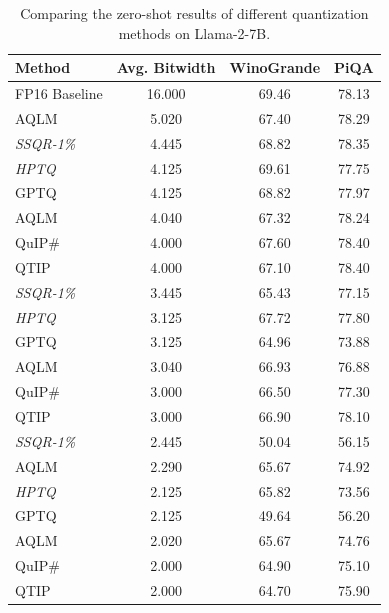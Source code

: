 \documentclass{article} %
\begin{document}
\begin{table}[htpb]
\caption{Comparing the zero-shot results of different quantization methods on Llama-2-7B.}
\label{tab:compare_to_other_methods}
\begin{center}
\begin{tabular}{lccc}
\toprule
Method & Avg. Bitwidth & WinoGrande & PiQA \\
\midrule
FP16 Baseline        & 16.000            & 69.46               & 78.13         \\
\midrule
AQLM            & 5.020             & 67.40               & 78.29         \\
\textit{SSQR-1\%}        & 4.445             & 68.82               & 78.35         \\
\textit{HPTQ}            & 4.125             & 69.61               & 77.75         \\
GPTQ            & 4.125             & 68.82               & 77.97         \\
AQLM            & 4.040             & 67.32               & 78.24         \\
QuIP\#          & 4.000             & 67.60               & 78.40         \\
QTIP            & 4.000             & 67.10               & 78.40         \\
\midrule
\textit{SSQR-1\%}        & 3.445             & 65.43               & 77.15         \\
\textit{HPTQ}            & 3.125             & 67.72               & 77.80         \\
GPTQ            & 3.125             & 64.96               & 73.88         \\
AQLM            & 3.040             & 66.93               & 76.88         \\
QuIP\#          & 3.000             & 66.50               & 77.30         \\
QTIP            & 3.000             & 66.90               & 78.10         \\
\midrule
\textit{SSQR-1\%}        & 2.445             & 50.04               & 56.15         \\
AQLM            & 2.290             & 65.67               & 74.92         \\
\textit{HPTQ}            & 2.125             & 65.82               & 73.56         \\
GPTQ            & 2.125             & 49.64               & 56.20         \\
AQLM            & 2.020             & 65.67               & 74.76         \\
QuIP\#          & 2.000             & 64.90               & 75.10         \\
QTIP            & 2.000             & 64.70               & 75.90        \\
\bottomrule
\end{tabular}
\end{center}
\end{table}
\end{document}
